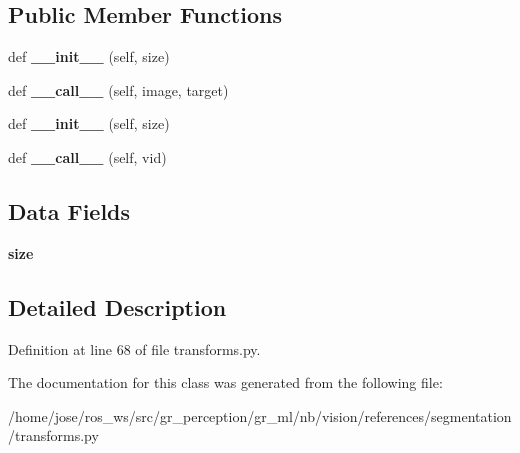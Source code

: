 \subsection*{Public Member Functions}
\begin{DoxyCompactItemize}
\item 
\mbox{\label{classtransforms_1_1CenterCrop_a9d28c3e39b677c3aa6ba16571e1d9483}} 
def {\bfseries \+\_\+\+\_\+init\+\_\+\+\_\+} (self, size)
\item 
\mbox{\label{classtransforms_1_1CenterCrop_a8f283a7c02f77390f84d1efbb91dc55e}} 
def {\bfseries \+\_\+\+\_\+call\+\_\+\+\_\+} (self, image, target)
\item 
\mbox{\label{classtransforms_1_1CenterCrop_a9d28c3e39b677c3aa6ba16571e1d9483}} 
def {\bfseries \+\_\+\+\_\+init\+\_\+\+\_\+} (self, size)
\item 
\mbox{\label{classtransforms_1_1CenterCrop_a4368fbac7e770e93f882599a5d9592b7}} 
def {\bfseries \+\_\+\+\_\+call\+\_\+\+\_\+} (self, vid)
\end{DoxyCompactItemize}
\subsection*{Data Fields}
\begin{DoxyCompactItemize}
\item 
\mbox{\label{classtransforms_1_1CenterCrop_a4ffe58b4e12972076f98fa7fe2f7c971}} 
{\bfseries size}
\end{DoxyCompactItemize}


\subsection{Detailed Description}


Definition at line 68 of file transforms.\+py.



The documentation for this class was generated from the following file\+:\begin{DoxyCompactItemize}
\item 
/home/jose/ros\+\_\+ws/src/gr\+\_\+perception/gr\+\_\+ml/nb/vision/references/segmentation/transforms.\+py\end{DoxyCompactItemize}
